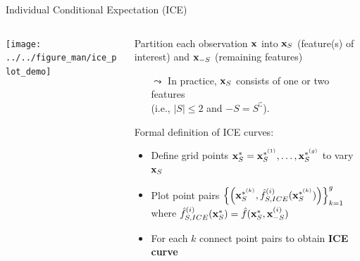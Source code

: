 \documentclass[10pt,compress,t,notes=noshow, xcolor=table]{beamer}
\begin{document}
\begin{frame}[c]{Individual Conditional Expectation (ICE) }

\begin{columns}[T, totalwidth=\textwidth]
\begin{column}{0.16\textwidth} %
\texttt{[image: ../../figure\_man/ice\_plot\_demo]}
\end{column}
\begin{column}{0.84\textwidth}


Partition each observation $\mathbf{x}$ into $\mathbf{x}_S$ (feature(s) of interest) and $\mathbf{x}_{-S}$ (remaining features)
\begin{itemize}
    \item[$\leadsto$] In practice, $\mathbf{x}_S$ consists of one or two features \\ (i.e., $|S| \leq 2$ and ${-S} = S^\complement$).
\end{itemize}

\medskip

Formal definition of ICE curves: 
\begin{itemize}
    \item Define grid points $\mathbf{x}_S^* = \mathbf{x}_S^{*^{(1)}}, \dots, \mathbf{x}_S^{*^{(g)}}$ to vary $\mathbf{x}_S$
    \item Plot point pairs $ \Bigl\{\left(\mathbf{x}_S^{*^{(k)}}, \hat{f}_{S,ICE}^{(i)}(\mathbf{x}_S^{*^{(k)}}) \right) \Bigr\}_{k=1}^g$
    \\where $\hat{f}_{S,ICE}^{(i)}(\mathbf{x}_S^*) = \hat{f}(\mathbf{x}_S^*, \mathbf{x}^{(i)}_{-S})$
    \item For each $k$ connect point pairs to obtain \textbf{ICE curve}
\end{itemize}


\end{column}
\end{columns}
\end{frame}
\end{document}
